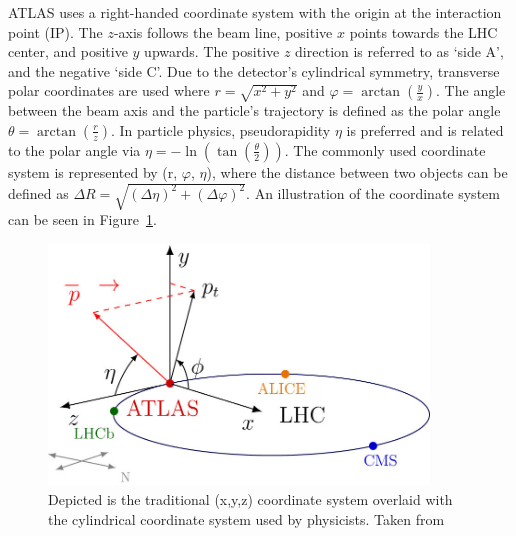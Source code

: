 ATLAS uses a right-handed coordinate system with the origin at the interaction point (IP). The $z$-axis follows the beam line, positive $x$ points towards the LHC center, and positive $y$ upwards. The positive $z$ direction is referred to as `side A', and the negative `side C'.  Due to the detector's cylindrical symmetry, transverse polar coordinates are used where $r = \sqrt{x^2 + y^2}$ and $\varphi = \arctan\left(\frac{y}{x}\right)$. 
The angle between the beam axis and the particle's trajectory is defined as the polar angle $\theta = \arctan\left(\frac{r}{z}\right)$. In particle physics, pseudorapidity $\eta$ is preferred and is related to the polar angle via $\eta = -\ln\left(\tan\left(\frac{\theta}{2}\right)\right)$. The commonly used coordinate system is represented by (r, $\varphi$, $\eta$), where the distance between two objects can be defined as $\Delta R = \sqrt{{(\Delta \eta)}^2 + {(\Delta \varphi)}^2}$. An illustration of the coordinate system can be seen in Figure~\ref{fig:atlas_coordinate_system}.
\begin{figure}
    \centering
    \includegraphics[width=0.9\textwidth]{figures/atlas/atlas_coordinate_system.jpg}
    \caption{Depicted is the traditional (x,y,z) coordinate system overlaid with the cylindrical coordinate system used by physicists. Taken from~\cite{atlas_coordinate_system}}\label{fig:atlas_coordinate_system}
\end{figure}